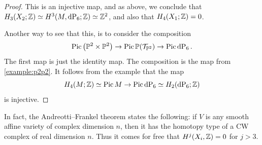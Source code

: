 \begin{proof}
This is an injective map, and as above, we conclude that $H_3(X_2;\Z) \simeq H^3(M,\dP6;\Z) \simeq \Z^2$, and also that $H_4(X_1;\mathbb{Z})=0$.

Another way to see that this, is to consider the composition
\[
\Pic \left( \P^2 \times \P^2 \right) \to \Pic \P(\mathcal T_{\P^2}) \to \Pic \dP6.
\]
The first map is just the identity map. The composition is the map from \cref{example:p2p2}. It follows from the example that the map
\[
H_4(M; \Z) \simeq \Pic M \to \Pic \dP6 \simeq H_ 2(\dP6; \Z)
\]
is injective.
\end{proof}

\begin{remark}
In fact, the Andreotti--Frankel theorem \cite{andreotti_affinecw} states the following: if $V$ is any smooth affine variety of complex dimension $n$, then it has the homotopy type of a CW complex of real dimension $n$. Thus it comes for free that $H^j(X_i,\mathbb{Z})=0$ for $j > 3$.
\end{remark}
 